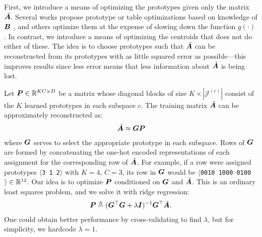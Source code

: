 First, we introduce a means of optimizing the prototypes given only the matrix $\tilde{\bm{A}}$. Several works propose prototype or table optimizations based on knowledge of $\bm{B}$ \cite{pairq,optimizedDists}, and others optimize them at the expense of slowing down the function $g(\cdot)$ \cite{cq,scq}. In contrast, we introduce a means of optimizing the centroids that does not do either of these. The idea is to choose prototypes such that $\tilde{\bm{A}}$ can be reconstructed from its prototypes with as little squared error as possible---this improves results since less error means that less information about $\tilde{\bm{A}}$ is being lost.

Let $\bm{P} \in \mathbb{R}^{KC \times D}$ be a matrix whose diagonal blocks of size $K \times |\mathcal{J}^{(c)}|$ consist of the $K$ learned prototypes in each subspace $c$. The training matrix $\tilde{\bm{A}}$ can be approximately reconstructed as:
\begin{align}
    \tilde{\bm{A}} \approx \bm{G}\bm{P}
\end{align}
where $\bm{G}$ serves to select the appropriate prototype in each subspace. Rows of $\bm{G}$ are formed by concatenating the one-hot encoded representations of each assignment for the corresponding row of $\tilde{\bm{A}}$. For example, if a row were assigned prototypes $\langle$\texttt{3 1 2}$\rangle$ with $K = 4$, $C = 3$, its row in $\bm{G}$ would be $\langle$\texttt{0010 1000 0100}$\rangle \in \mathbb{R}^{12}$. Our idea is to optimize $\bm{P}$ conditioned on $\bm{G}$ and $\tilde{\bm{A}}$. This is an ordinary least squares problem, and we solve it with ridge regression:
\begin{align}
\vspace*{-1mm}
    \mat{P} \triangleq (\mat{G}^\top \mat{G} + \lambda \mat{I})^{-1} \mat{G}^\top \tilde{\A}.
\end{align}
One could obtain better performance by cross-validating to find $\lambda$, but for simplicity, we hardcode $\lambda = 1$. %

